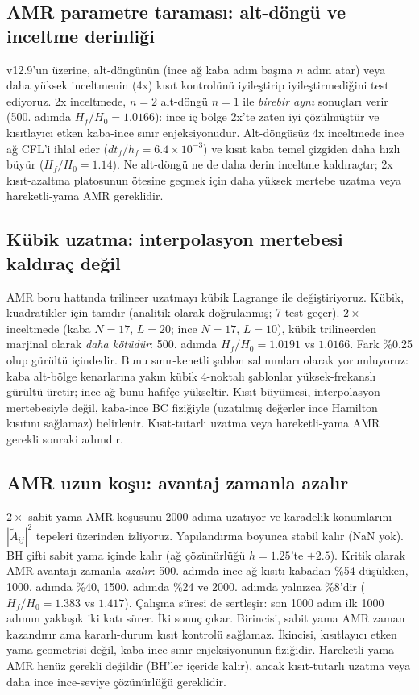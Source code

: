 \subsection{AMR parametre taraması: alt-döngü ve inceltme derinliği}

v12.9'un üzerine, alt-döngünün (ince ağ kaba adım başına $n$ adım atar) veya daha yüksek inceltmenin (4x) kısıt kontrolünü iyileştirip iyileştirmediğini test ediyoruz. 2x inceltmede, $n=2$ alt-döngü $n=1$ ile \emph{birebir aynı} sonuçları verir (500. adımda $H_f/H_0 = 1.0166$): ince iç bölge 2x'te zaten iyi çözülmüştür ve kısıtlayıcı etken kaba-ince sınır enjeksiyonudur. Alt-döngüsüz 4x inceltmede ince ağ CFL'i ihlal eder ($dt_f/h_f = 6.4\times 10^{-3}$) ve kısıt kaba temel çizgiden daha hızlı büyür ($H_f/H_0 = 1.14$). Ne alt-döngü ne de daha derin inceltme kaldıraçtır; 2x kısıt-azaltma platosunun ötesine geçmek için daha yüksek mertebe uzatma veya hareketli-yama AMR gereklidir.

\subsection{Kübik uzatma: interpolasyon mertebesi kaldıraç değil}

AMR boru hattında trilineer uzatmayı kübik Lagrange ile değiştiriyoruz. Kübik, kuadratikler için tamdır (analitik olarak doğrulanmış; 7 test geçer). $2\times$ inceltmede (kaba $N=17$, $L=20$; ince $N=17$, $L=10$), kübik trilineerden marjinal olarak \emph{daha kötüdür}: 500. adımda $H_f/H_0 = 1.0191$ vs $1.0166$. Fark \%0.25 olup gürültü içindedir. Bunu sınır-kenetli şablon salınımları olarak yorumluyoruz: kaba alt-bölge kenarlarına yakın kübik 4-noktalı şablonlar yüksek-frekanslı gürültü üretir; ince ağ bunu hafifçe yükseltir. Kısıt büyümesi, interpolasyon mertebesiyle değil, kaba-ince BC fiziğiyle (uzatılmış değerler ince Hamilton kısıtını sağlamaz) belirlenir. Kısıt-tutarlı uzatma veya hareketli-yama AMR gerekli sonraki adımdır.

\subsection{AMR uzun koşu: avantaj zamanla azalır}

$2\times$ sabit yama AMR koşusunu 2000 adıma uzatıyor ve karadelik konumlarını $|\tilde A_{ij}|^2$ tepeleri üzerinden izliyoruz. Yapılandırma boyunca stabil kalır (NaN yok). BH çifti sabit yama içinde kalır (ağ çözünürlüğü $h=1.25$'te $\pm 2.5$). Kritik olarak AMR avantajı zamanla \emph{azalır}: 500. adımda ince ağ kısıtı kabadan \%54 düşükken, 1000. adımda \%40, 1500. adımda \%24 ve 2000. adımda yalnızca \%8'dir ($H_f/H_0 = 1.383$ vs $1.417$). Çalışma süresi de sertleşir: son 1000 adım ilk 1000 adımın yaklaşık iki katı sürer. İki sonuç çıkar. Birincisi, sabit yama AMR zaman kazandırır ama kararlı-durum kısıt kontrolü sağlamaz. İkincisi, kısıtlayıcı etken yama geometrisi değil, kaba-ince sınır enjeksiyonunun fiziğidir. Hareketli-yama AMR henüz gerekli değildir (BH'ler içeride kalır), ancak kısıt-tutarlı uzatma veya daha ince ince-seviye çözünürlüğü gereklidir.

